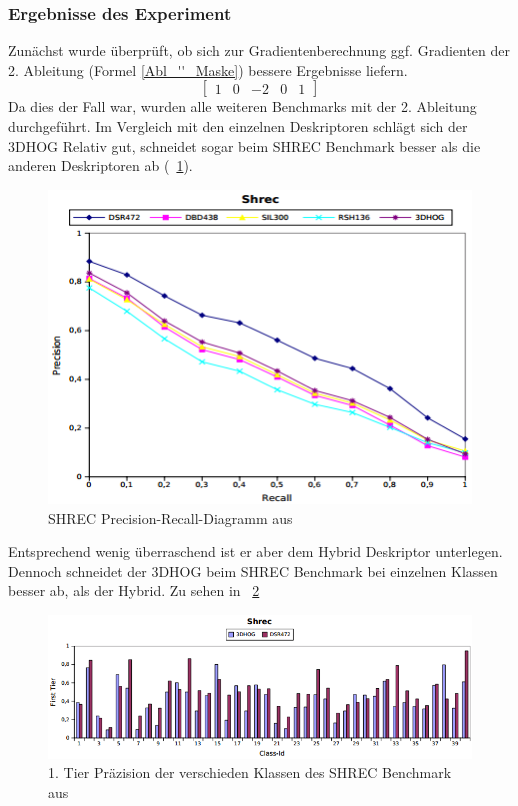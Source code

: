 \subsubsection{Ergebnisse des Experiment}
Zunächst wurde überprüft, ob sich zur Gradientenberechnung ggf. Gradienten der 2. Ableitung (Formel \ref{Abl_''_Maske}) bessere Ergebnisse liefern.    
\begin{equation}
\label{Abl_''_Maske}
\begin{bmatrix}
1 & 0 & -2 & 0 & 1
\end{bmatrix}
\end{equation}
Da dies der Fall war, wurden alle weiteren Benchmarks mit der 2. Ableitung durchgeführt. Im Vergleich mit den einzelnen Deskriptoren schlägt sich der 3DHOG Relativ gut, schneidet sogar beim SHREC Benchmark besser als die anderen Deskriptoren ab (\figurename~\ref{Shrec_diag}).

 \begin{figure}[thpb]
 	\centering
 	\includegraphics[width=\linewidth]{2-Hauptteil/pics/SHREC_diag.png}
 	\caption{SHREC Precision-Recall-Diagramm aus \cite{scherer2010histograms}}
 	\label{Shrec_diag}
 \end{figure}
 
 Entsprechend wenig überraschend ist er aber dem Hybrid Deskriptor unterlegen. Dennoch schneidet der 3DHOG beim SHREC Benchmark bei einzelnen Klassen besser ab, als der Hybrid. Zu sehen in \figurename~\ref{SHREC_3DHOG_DSR472} 

 \begin{figure}[thpb]
 	\centering
 	\includegraphics[width=\linewidth]{2-Hauptteil/pics/SHREC_3DHOG_DSR472.png}
 	\caption{1. Tier Präzision der verschieden Klassen des SHREC Benchmark aus \cite{scherer2010histograms}}
 	\label{SHREC_3DHOG_DSR472}
 \end{figure}
 

